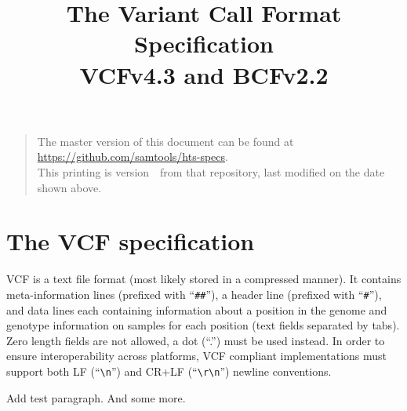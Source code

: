 \documentclass[8pt]{article}
\begin{document}

\title{The Variant Call Format Specification \\ \vspace{0.5em} \large VCFv4.3 and BCFv2.2}
\date{\headdate}
\maketitle
\begin{quote}\small
The master version of this document can be found at \url{https://github.com/samtools/hts-specs}.\\
This printing is version~\commitdesc\ from that repository, last modified on the date shown above.
\end{quote}
\vspace*{1em}

\newpage
\tableofcontents
\newpage

\section{The VCF specification}
VCF is a text file format (most likely stored in a compressed manner).
It contains meta-information lines (prefixed with ``\verb|##|''), a header line (prefixed with ``\verb|#|''), and data lines each containing information about a position in the genome and genotype information on samples for each position (text fields separated by tabs).
Zero length fields are not allowed, a dot (``.'') must be used instead.
In order to ensure interoperability across platforms, VCF compliant implementations must support both LF (``\verb|\n|'') and CR+LF (``\verb|\r\n|'') newline conventions.

Add test paragraph. And some more.
\end{document}
